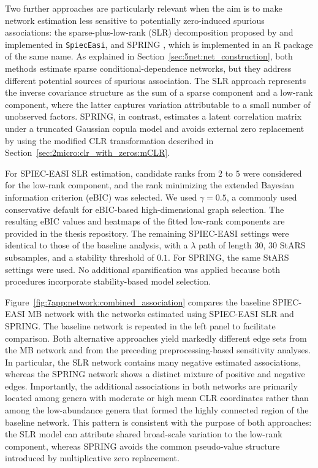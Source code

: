 Two further approaches are particularly relevant when the aim is to make network estimation less sensitive to potentially zero-induced spurious associations: the sparse-plus-low-rank (SLR) decomposition proposed by \citet{kurtz2019disentangling} and implemented in \texttt{SpiecEasi}, and SPRING \citep{yoon2019microbial}, which is implemented in an R package of the same name. As explained in Section~\ref{sec:5net:net_construction}, both methods estimate sparse conditional-dependence networks, but they address different potential sources of spurious association. The SLR approach represents the inverse covariance structure as the sum of a sparse component and a low-rank component, where the latter captures variation attributable to a small number of unobserved factors. SPRING, in contrast, estimates a latent correlation matrix under a truncated Gaussian copula model and avoids external zero replacement by using the modified CLR transformation described in Section~\ref{sec:2micro:clr_with_zeros:mCLR}.

For SPIEC-EASI SLR estimation, candidate ranks from $2$ to $5$ were considered for the low-rank component, and the rank minimizing the extended Bayesian information criterion (eBIC) was selected. We used $\gamma = 0.5$, a commonly used conservative default for eBIC-based high-dimensional graph selection. The resulting eBIC values and heatmaps of the fitted low-rank components are provided in the thesis repository. The remaining SPIEC-EASI settings were identical to those of the baseline analysis, with a $\lambda$ path of length $30$, $30$ StARS subsamples, and a stability threshold of $0.1$. For SPRING, the same StARS settings were used. No additional sparsification was applied because both procedures incorporate stability-based model selection.

Figure~\ref{fig:7app:network:combined_association} compares the baseline SPIEC-EASI MB network with the networks estimated using SPIEC-EASI SLR and SPRING. The baseline network is repeated in the left panel to facilitate comparison. Both alternative approaches yield markedly different edge sets from the MB network and from the preceding preprocessing-based sensitivity analyses. In particular, the SLR network contains many negative estimated associations, whereas the SPRING network shows a distinct mixture of positive and negative edges. Importantly, the additional associations in both networks are primarily located among genera with moderate or high mean CLR coordinates rather than among the low-abundance genera that formed the highly connected region of the baseline network. This pattern is consistent with the purpose of both approaches: the SLR model can attribute shared broad-scale variation to the low-rank component, whereas SPRING avoids the common pseudo-value structure introduced by multiplicative zero replacement.

